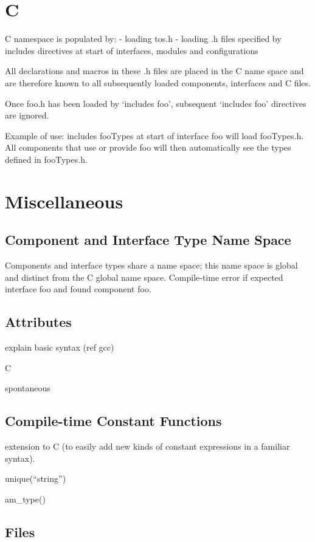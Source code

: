 \documentclass[11pt]{article}
\begin{document}
\section{C}

C namespace is populated by:
- loading tos.h 
- loading .h files specified by includes directives at start of
interfaces, modules and configurations

All declarations and macros in these .h files are placed in the C name
space and are therefore known to all subsequently loaded components,
interfaces and C files.

Once foo.h has been loaded by `includes foo', subsequent `includes foo'
directives are ignored.

Example of use: includes fooTypes at start of interface foo will load
fooTypes.h. All components that use or provide foo will then automatically
see the types defined in fooTypes.h.

\section{Miscellaneous}

\subsection{Component and Interface Type Name Space}

Components and interface types share a name space; this name space is 
global and distinct from the C global name space. Compile-time error
if expected interface foo and found component foo.

\subsection{Attributes}

explain basic syntax (ref gcc)

C

spontaneous

\subsection{Compile-time Constant Functions}

extension to C (to easily add new kinds of constant expressions in a familiar
syntax).

unique(``string'')

am_type()

\subsection{Files}
\end{document}
